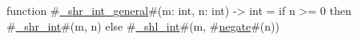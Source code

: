 function #\hyperref[sailRISCVzzyshrzyintzygeneral]{\_shr\_int\_general}#(m: int, n: int) -> int = if n >= 0 then #\hyperref[sailRISCVzzyshrzyint]{\_shr\_int}#(m, n) else #\hyperref[sailRISCVzzyshlzyint]{\_shl\_int}#(m, #\hyperref[sailRISCVznegate]{negate}#(n))
